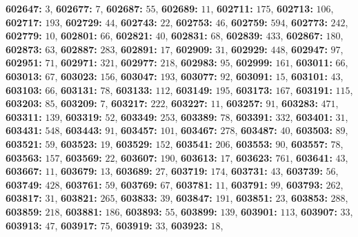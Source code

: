 \textsf{\bfseries 602647:} $3$, \textsf{\bfseries 602677:} $7$, \textsf{\bfseries 602687:} $55$, \textsf{\bfseries 602689:} $11$, \textsf{\bfseries 602711:} $175$, \textsf{\bfseries 602713:} $106$, \textsf{\bfseries 602717:} $193$, \textsf{\bfseries 602729:} $44$, \textsf{\bfseries 602743:} $22$, \textsf{\bfseries 602753:} $46$, \textsf{\bfseries 602759:} $594$, \textsf{\bfseries 602773:} $242$, \textsf{\bfseries 602779:} $10$, \textsf{\bfseries 602801:} $66$, \textsf{\bfseries 602821:} $40$, \textsf{\bfseries 602831:} $68$, \textsf{\bfseries 602839:} $433$, \textsf{\bfseries 602867:} $180$, \textsf{\bfseries 602873:} $63$, \textsf{\bfseries 602887:} $283$, \textsf{\bfseries 602891:} $17$, \textsf{\bfseries 602909:} $31$, \textsf{\bfseries 602929:} $448$, \textsf{\bfseries 602947:} $97$, \textsf{\bfseries 602951:} $71$, \textsf{\bfseries 602971:} $321$, \textsf{\bfseries 602977:} $218$, \textsf{\bfseries 602983:} $95$, \textsf{\bfseries 602999:} $161$, \textsf{\bfseries 603011:} $66$, \textsf{\bfseries 603013:} $67$, \textsf{\bfseries 603023:} $156$, \textsf{\bfseries 603047:} $193$, \textsf{\bfseries 603077:} $92$, \textsf{\bfseries 603091:} $15$, \textsf{\bfseries 603101:} $43$, \textsf{\bfseries 603103:} $66$, \textsf{\bfseries 603131:} $78$, \textsf{\bfseries 603133:} $112$, \textsf{\bfseries 603149:} $195$, \textsf{\bfseries 603173:} $167$, \textsf{\bfseries 603191:} $115$, \textsf{\bfseries 603203:} $85$, \textsf{\bfseries 603209:} $7$, \textsf{\bfseries 603217:} $222$, \textsf{\bfseries 603227:} $11$, \textsf{\bfseries 603257:} $91$, \textsf{\bfseries 603283:} $471$, \textsf{\bfseries 603311:} $139$, \textsf{\bfseries 603319:} $52$, \textsf{\bfseries 603349:} $253$, \textsf{\bfseries 603389:} $78$, \textsf{\bfseries 603391:} $332$, \textsf{\bfseries 603401:} $31$, \textsf{\bfseries 603431:} $548$, \textsf{\bfseries 603443:} $91$, \textsf{\bfseries 603457:} $101$, \textsf{\bfseries 603467:} $278$, \textsf{\bfseries 603487:} $40$, \textsf{\bfseries 603503:} $89$, \textsf{\bfseries 603521:} $59$, \textsf{\bfseries 603523:} $19$, \textsf{\bfseries 603529:} $152$, \textsf{\bfseries 603541:} $206$, \textsf{\bfseries 603553:} $90$, \textsf{\bfseries 603557:} $78$, \textsf{\bfseries 603563:} $157$, \textsf{\bfseries 603569:} $22$, \textsf{\bfseries 603607:} $190$, \textsf{\bfseries 603613:} $17$, \textsf{\bfseries 603623:} $761$, \textsf{\bfseries 603641:} $43$, \textsf{\bfseries 603667:} $11$, \textsf{\bfseries 603679:} $13$, \textsf{\bfseries 603689:} $27$, \textsf{\bfseries 603719:} $174$, \textsf{\bfseries 603731:} $43$, \textsf{\bfseries 603739:} $56$, \textsf{\bfseries 603749:} $428$, \textsf{\bfseries 603761:} $59$, \textsf{\bfseries 603769:} $67$, \textsf{\bfseries 603781:} $11$, \textsf{\bfseries 603791:} $99$, \textsf{\bfseries 603793:} $262$, \textsf{\bfseries 603817:} $31$, \textsf{\bfseries 603821:} $265$, \textsf{\bfseries 603833:} $39$, \textsf{\bfseries 603847:} $191$, \textsf{\bfseries 603851:} $23$, \textsf{\bfseries 603853:} $288$, \textsf{\bfseries 603859:} $218$, \textsf{\bfseries 603881:} $186$, \textsf{\bfseries 603893:} $55$, \textsf{\bfseries 603899:} $139$, \textsf{\bfseries 603901:} $113$, \textsf{\bfseries 603907:} $33$, \textsf{\bfseries 603913:} $47$, \textsf{\bfseries 603917:} $75$, \textsf{\bfseries 603919:} $33$, \textsf{\bfseries 603923:} $18$, 
